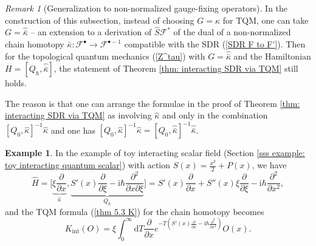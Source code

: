 \documentclass{amsart}
\theoremstyle{plain} %
\theoremstyle{definition}
\newtheorem{expl}[thm]{Example}
\theoremstyle{remark}
\newtheorem{rem}[thm]{Remark}
\newcommand{\bt}{\bullet}
\newcommand{\ra}{\rightarrow}
\newcommand{\wh}{\widehat}
\newcommand{\F}{\mathcal{F}}
\newcommand{\dd}{\partial}
\newcommand{\ii}{\mathrm{int}}
\newcommand{\iii}{\mathrm{i}}
\newcommand{\SDR}[5]{#5\;\;\raisebox{1.3pt}{\rotatebox[origin=c]{90}{$\curvearrowright$}}\;\; #1 \underset{#4}{\stackrel{#3}{\leftrightarrows}} #2}  %
\newcommand{\cl}{\mathrm{cl}}
\newcommand{\dr}{\mathrm{d}}
\begin{document}
\begin{rem}[Generalization to non-normalized gauge-fixing operators]
\label{rem: non-normalized chain homotopy}
 In the construction of this subsection, instead of choosing $G=\wh\kappa$ for TQM, one can take $G=\wh{\bar\kappa}$ -- an extension to a derivation of $\wh{S}\F^*$ of the dual of a non-normalized chain homotopy $\bar\kappa\colon \F^\bt\ra \F^{\bt-1}$ compatible with the SDR (\ref{SDR F to F'}). Then for the topological quantum mechanics (\ref{Z^tau}) with $G=\wh{\bar\kappa}$ and the Hamiltonian $H=[Q_\hbar,\wh{\bar\kappa}]$, the statement of Theorem \ref{thm: interacting SDR via TQM} still holds. 
 
The reason is that one can arrange the formulae in the proof of Theorem \ref{thm: interacting SDR via TQM} as involving $\wh\kappa$ and only in the combination $[Q_0,\wh\kappa]^{-1}\wh\kappa $ and one has
$[Q_0,\wh\kappa]^{-1}\wh\kappa =[Q_0,\wh{\bar\kappa}]^{-1}\wh{\bar\kappa}$.
\end{rem}





\begin{expl}
    In the example of toy interacting scalar field (Section \ref{sss example: toy interacting quantum scalar}) with action $S(x)=\frac{x^2}{2}+P(x)$, we have
    \begin{equation}
        \wh{H}=\Big[\underbrace{\xi \frac{\dd}{\dd x}}_{\wh\kappa}, \underbrace{S'(x)\frac{\dd}{\dd \xi}-\iii\hbar \frac{\dd^2}{\dd x\dd \xi}}_{Q_\hbar}\Big]=
        S'(x)\frac{\dd}{\dd x}+S''(x) \xi \frac{\dd}{\dd \xi}-\iii\hbar \frac{\dd^2}{\dd x^2},
    \end{equation}
    and the TQM formula (\ref{thm 5.3 K}) for the chain homotopy becomes
    \begin{equation}
        K_\ii(O)=\xi \int_0^\infty \dr T \frac{\dd}{\dd x} e^{-T\left(S'(x)\frac{\dd}{\dd x}-\iii\hbar \frac{\dd^2}{\dd x^2}\right)} O(x).
    \end{equation}
\end{expl}
\end{document}
